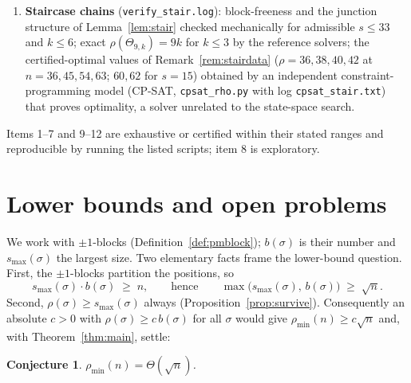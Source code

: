 \documentclass[11pt]{article}
\newtheorem{conjecture}[theorem]{Conjecture}
\theoremstyle{definition}
\newcommand{\pmin}{\rho_{\min}}
\newcommand{\smax}{s_{\max}}
\begin{document}
\begin{enumerate}
permutations of $S_{13}$ properly-colored Hamiltonian, exactly $16$ failures at
$n = 14$ -- are reproducible from the census programs
(\texttt{cpp/bfcensus.cpp} with log \texttt{blockfree13.txt}, hours of CPU time, a
contracted matching-union Hamiltonicity criterion rather than the path solver,
independently re-run once; and \texttt{n14\_doublebad.py} for the exact count).
\item \textbf{Staircase chains} (\texttt{verify\_stair.log}): block-freeness and the
junction structure of
Lemma~\ref{lem:stair} checked mechanically for admissible $s \le 33$ and $k \le 6$;
exact $\rho(\Theta_{9,k}) = 9k$ for $k \le 3$ by the reference solvers; the
certified-optimal values of Remark~\ref{rem:stairdata}
($\rho = 36, 38, 40, 42$ at $n = 36, 45, 54, 63$; $60, 62$ for $s = 15$) obtained by
an independent constraint-programming model (CP-SAT, \texttt{cpsat\_rho.py} with log
\texttt{cpsat\_stair.txt}) that proves optimality, a solver unrelated to the
state-space search.
\end{enumerate}

Items 1--7 and 9--12 are exhaustive or certified within their stated ranges and
reproducible by running the listed scripts; item 8 is exploratory.

\section{Lower bounds and open problems}\label{sec:disc}

We work with $\pm1$-blocks (Definition~\ref{def:pmblock}); $b(\sigma)$ is their number
and $\smax(\sigma)$ the largest size. Two elementary facts frame the lower-bound
question. First, the $\pm1$-blocks partition the positions, so
\[
\smax(\sigma) \cdot b(\sigma) \;\ge\; n,
\qquad\text{hence}\qquad
\max\bigl(\smax(\sigma),\, b(\sigma)\bigr) \;\ge\; \sqrt n .
\]
Second, $\rho(\sigma) \ge \smax(\sigma)$ always
(Proposition~\ref{prop:survive}). Consequently an absolute $c > 0$ with
$\rho(\sigma) \ge c\, b(\sigma)$ for all $\sigma$ would give
$\pmin(n) \ge c\sqrt n$ and, with Theorem~\ref{thm:main}, settle:

\begin{conjecture}\label{conj:sqrt}
$\pmin(n) = \Theta(\sqrt n)$.
\end{conjecture}
\end{document}
